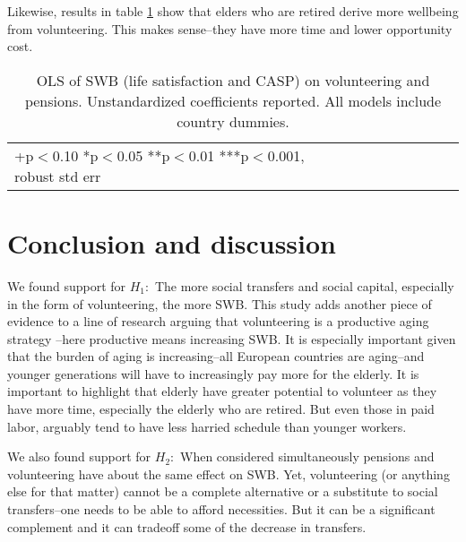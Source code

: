 \documentclass[10pt, letterpaper]{article}
\begin{document}
\begin{spacing}{1.4}
Likewise, results in table \ref{regEw6} show that elders
who are retired derive more wellbeing from volunteering. This makes sense--they
have more time and lower opportunity cost. 
%

\begin{spacing}{.9}
\begin{table}[H]\centering \caption{OLS of SWB  (life satisfaction and CASP) on
    volunteering and pensions.  Unstandardized coefficients reported. All models
  include country dummies.}  \begin{scriptsize} \begin{tabular}{p{1.8in}p{.5in}p{.5in}p{.5in}p{.5in}|p{.5in}p{.5in}p{.5in}p{.5in}p{.5in}p{.4in}p{.5in}p{.4in}}\hline 
      \hline\multicolumn{5}{l}{+p$<$0.10 *p$<$0.05 **p$<$0.01 ***p$<$0.001,
        robust std err} \end{tabular}\label{regEw6} \end{scriptsize}\end{table}
\end{spacing}





\section*{Conclusion and discussion}

We found support for $H_1:$ The more social transfers and social capital,
especially in the form of volunteering, the more SWB.
This study adds another piece of evidence to a line of research arguing that
volunteering is a productive aging strategy
\citep[e.g.,][]{wilson12B,hank09}--here productive means increasing SWB.
It is especially important given that the burden of aging %
 is increasing--all European countries are aging--and younger generations will
 have to increasingly pay more for the elderly. It is important to highlight that elderly have greater potential to volunteer as
they have more time, especially the elderly who are retired. But even those in
paid labor, arguably tend to have less harried schedule than younger workers.


We also found support for $H_2:$ When considered simultaneously pensions and volunteering have about the same effect on SWB.
Yet, volunteering (or anything else for that matter) cannot be a complete alternative
or a substitute to social transfers--one needs to be able to afford necessities.
But it can be a significant complement and it can tradeoff some of the decrease in transfers.


\end{spacing}
\end{document}
